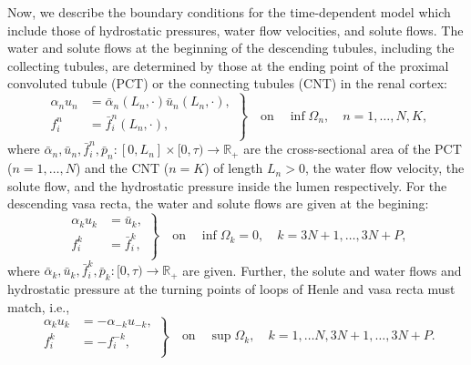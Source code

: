\documentclass{article}
\begin{document}
Now, we describe the boundary conditions for the time-dependent model which include those of hydrostatic pressures, water flow velocities, and solute flows.
The water and solute flows at the beginning of the descending tubules, including the collecting tubules, are determined by those at the ending point of the proximal convoluted tubule (PCT) or the connecting tubules (CNT) in the renal cortex:
\begin{equation}
    \left.
    \begin{aligned}
        \alpha_n u_n &= \bar{\alpha}_n(L_n,\cdot)\bar{u}_n(L_n,\cdot),\\
        f_i^n &= \bar{f}_i^n(L_n,\cdot),\\
    \end{aligned}\right\}
    \quad\text{on}\quad \inf\Omega_n,\quad n=1,\dots,N,K,
\end{equation}
where $\bar{\alpha}_n,\bar{u}_n,\bar{f}_i^n,\bar{p}_n:[0,L_n]\times [0,\tau)\to \mathbb{R}_+$ are the cross-sectional area of the PCT ($n=1,\dots,N$) and the CNT ($n=K$) of length $L_n>0$, the water flow velocity, the solute flow, and the hydrostatic pressure inside the lumen respectively.
For the descending vasa recta, the water and solute flows are given at the begining:
\begin{equation}
    \left.
        \begin{aligned}
            \alpha_k u_k &= \bar{u}_k,\\
            f_i^k &= \bar{f}_i^k,\\
        \end{aligned}\right\}
        \quad\text{on}\quad \inf\Omega_k = 0,\quad k=3N+1,\dots,3N+P,
\end{equation}
where $\bar{\alpha}_k,\bar{u}_k,\bar{f}_i^k,\bar{p}_k:[0,\tau)\to \mathbb{R}_+$ are given.
Further, the solute and water flows and hydrostatic pressure at the turning points of loops of Henle and vasa recta must match, i.e.,
\begin{equation}
\left.
    \begin{aligned}
        \alpha_ku_k &= -\alpha_{-k}u_{-k},\\
        f_i^k &= -f_i^{-k},\\
    \end{aligned}\right\}
    \quad\text{on}\quad\sup\Omega_k,\quad k= 1,\dots N,3N+1,\dots,3N+P.
\end{equation}
\end{document}
